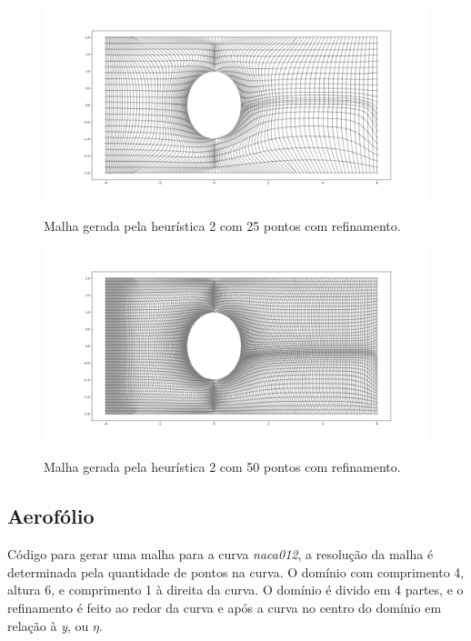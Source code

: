 \documentclass[a4paper]{article}
\begin{document}
\begin{figure}[H]
	\centering
	\includegraphics[width=1.0\textwidth]{heuristica_2_25pts_refined.png}
	\label{fig:heuristic2_50pts_refined} 
	\caption[caption]{Malha gerada pela heurística 2 com 25 pontos com refinamento.}
\end{figure}

\begin{figure}[H]
	\centering
	\includegraphics[width=1.0\textwidth]{heuristica_2_50pts_refined.png}
	\label{fig:heuristic2_100pts_refined} 
	\caption[caption]{Malha gerada pela heurística 2 com 50 pontos com refinamento.}
\end{figure}



\subsection{Aerofólio}

Código para gerar uma malha para a curva \textit{naca012}, a resolução da malha é determinada pela quantidade de pontos na curva. O domínio com comprimento 4, altura 6, e comprimento 1 à direita da curva. O domínio é divido em 4 partes, e o refinamento é feito ao redor da curva e após a curva no centro do domínio em relação à \textit{y}, ou $\eta$.
\end{document}
